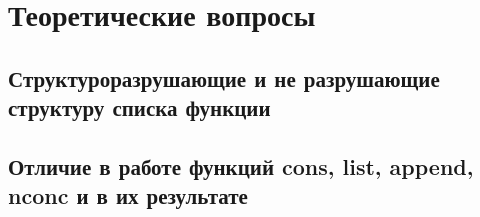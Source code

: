 \vspace{4mm}
\begin{minipage}{0.92\linewidth}
\begin{lstlisting}
\end{lstlisting}
\end{minipage}

\chapter{Теоретические вопросы}

\section{Структуроразрушающие и не разрушающие структуру списка
функции}

\section{Отличие в работе функций cons, list, append, nconc и в их результате}
